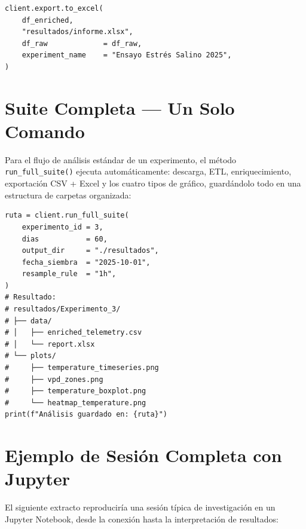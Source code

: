 \begin{lstlisting}[style=trama, caption={Exportación a Excel estructurado}]
client.export.to_excel(
    df_enriched,
    "resultados/informe.xlsx",
    df_raw             = df_raw,
    experiment_name    = "Ensayo Estrés Salino 2025",
)
\end{lstlisting}

\section{Suite Completa — Un Solo Comando}

Para el flujo de análisis estándar de un experimento, el método \texttt{run\_full\_suite()}
ejecuta automáticamente: descarga, ETL, enriquecimiento, exportación CSV + Excel y los
cuatro tipos de gráfico, guardándolo todo en una estructura de carpetas organizada:

\begin{lstlisting}[style=trama, caption={Análisis completo en una sola llamada}]
ruta = client.run_full_suite(
    experimento_id = 3,
    dias           = 60,
    output_dir     = "./resultados",
    fecha_siembra  = "2025-10-01",
    resample_rule  = "1h",
)
# Resultado:
# resultados/Experimento_3/
# ├── data/
# │   ├── enriched_telemetry.csv
# │   └── report.xlsx
# └── plots/
#     ├── temperature_timeseries.png
#     ├── vpd_zones.png
#     ├── temperature_boxplot.png
#     └── heatmap_temperature.png
print(f"Análisis guardado en: {ruta}")
\end{lstlisting}

\section{Ejemplo de Sesión Completa con Jupyter}

El siguiente extracto reproduciría una sesión típica de investigación en un Jupyter Notebook,
desde la conexión hasta la interpretación de resultados:


